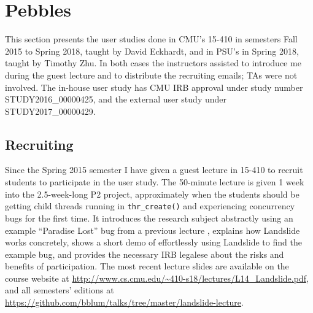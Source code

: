 
\section{Pebbles}

This section presents the user studies done in
CMU's 15-410 in semesters Fall 2015 to Spring 2018,
taught by David Eckhardt,
and in PSU's \psuos in Spring 2018,
taught by Timothy Zhu.
In both cases the instructors assisted to introduce me during the guest lecture
and to distribute the recruiting emails;
TAs were not involved.
The in-house user study has CMU IRB approval under study number STUDY2016\_00000425,
and the external user study under STUDY2017\_00000429.


\subsection{Recruiting}
\label{sec:education-pebbles-recruiting}

Since the Spring 2015 semester I have given a guest lecture in 15-410
to recruit students to participate in the user study.
The 50-minute lecture is given 1 week into the 2.5-week-long P2 project,
approximately when the students should be getting child threads running in {\tt thr\_create()}
and experiencing concurrency bugs for the first time.
It introduces the research subject abstractly
using an example ``Paradise Lost'' bug from a previous lecture \cite{paradise-lost},
explains how Landslide works concretely,
shows a short demo of effortlessly using Landslide to find the example bug,
and provides the necessary IRB legalese about the risks and benefits of participation.
The most recent lecture slides are available on the course website at
\url{http://www.cs.cmu.edu/~410-s18/lectures/L14_Landslide.pdf},
and all semesters' editions at
\url{https://github.com/bblum/talks/tree/master/landslide-lecture}.

